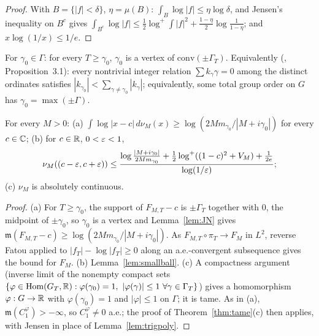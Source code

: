 \begin{proof}
With $B=\{|f|<\delta\}$, $\eta=\mu(B)$: $\int_B\log|f|\le\eta\log\delta$, and Jensen's inequality on $B^c$ gives $\int_{B^c}\log|f|\le\frac12\log^+\int|f|^2+\frac{1-\eta}2\log\frac1{1-\eta}$; and $x\log(1/x)\le1/e$.
\end{proof}

\begin{hypothesis}[V$(\gamma_0)$]
For $\gamma_0\in\Gamma$: for every $T\ge\gamma_0$, $\gamma_0$ is a vertex of $\mathrm{conv}(\pm\Gamma_T)$. Equivalently \textup{(, Proposition~3.1)}: every nontrivial integer relation $\sum k_\gamma\gamma=0$ among the distinct ordinates satisfies $|k_{\gamma_0}|<\sum_{\gamma\ne\gamma_0}|k_\gamma|$; equivalently, some total group order on $G$ has $\gamma_0=\max(\pm\Gamma)$.
\end{hypothesis}

\begin{theorem}\label{thm:V}
For every $M>0$: \textup{(a)} $\int\log|x-c|\,d\nu_M(x)\ge\log(2Mm_{\gamma_0}/|M+i\gamma_0|)$ for every $c\in\mathbb C$; \textup{(b)} for $c\in\mathbb R$, $0<\varepsilon<1$,
\[
\nu_M((c-\varepsilon,c+\varepsilon))\le\frac{\log\frac{|M+i\gamma_0|}{2Mm_{\gamma_0}}+\frac12\log^+((1-c)^2+V_M)+\frac1{2e}}{\log(1/\varepsilon)};
\]
\textup{(c)} $\nu_M$ is absolutely continuous.
\end{theorem}

\begin{proof}
(a) For $T\ge\gamma_0$, the support of $F_{M,T}-c$ is $\pm\Gamma_T$ together with $0$, the midpoint of $\pm\gamma_0$, so $\gamma_0$ is a vertex and Lemma~\ref{lem:JN} gives $\mathfrak m(F_{M,T}-c)\ge\log(2Mm_{\gamma_0}/|M+i\gamma_0|)$. As $F_{M,T}\circ\pi_T\to F_M$ in $L^2$, reverse Fatou applied to $|f_T|-\log|f_T|\ge0$ along an a.e.-convergent subsequence gives the bound for $F_M$. (b) Lemma~\ref{lem:smallball}. (c) A compactness argument (inverse limit of the nonempty compact sets $\{\varphi\in\mathrm{Hom}(G_T,\RR):\varphi(\gamma_0)=1,\ |\varphi(\gamma)|\le1\ \forall\gamma\in\Gamma_T\}$) gives a homomorphism $\varphi:G\to\mathbb R$ with $\varphi(\gamma_0)=1$ and $|\varphi|\le1$ on $\Gamma$; it is tame. As in (a), $\mathfrak m(C^\varphi_1)>-\infty$, so $C^\varphi_1\ne0$ a.e.; the proof of Theorem~\ref{thm:tame}(c) then applies, with Jensen in place of Lemma~\ref{lem:trigpoly}.
\end{proof}

